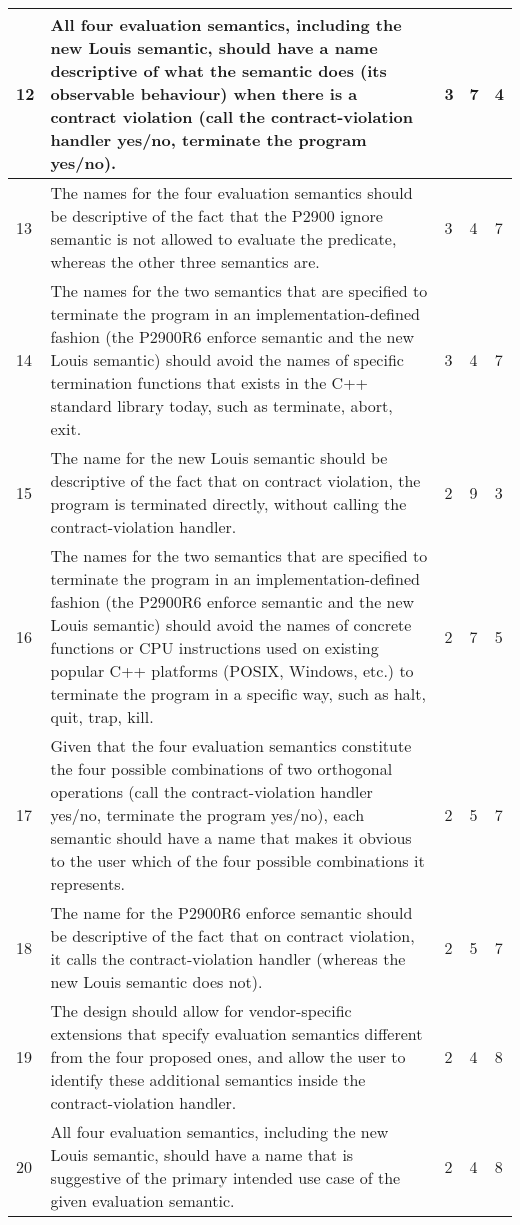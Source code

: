 \begin{longtable}{|p{0.8cm}|p{11.5cm}|p{0.6cm}|p{0.6cm}|p{0.6cm}|}
12 & All four evaluation semantics, including the new Louis semantic, should have a name descriptive of what the semantic does (its observable behaviour) when there is a contract violation (call the contract-violation handler yes/no, terminate the program yes/no). & 3 & 7 & 4 \\ \hline
13 & The names for the four evaluation semantics should be descriptive of the fact that the P2900 ignore semantic is not allowed to evaluate the predicate, whereas the other three semantics are. & 3 & 4 & 7 \\ \hline
14 & The names for the two semantics that are specified to terminate the program in an implementation-defined fashion (the P2900R6 enforce semantic and the new Louis semantic) should avoid the names of specific termination functions that exists in the C++ standard library today, such as terminate, abort, exit. & 3 & 4 & 7 \\ \hline
15 & The name for the new Louis semantic should be descriptive of the fact that on contract violation, the program is terminated directly, without calling the contract-violation handler. & 2 & 9 & 3 \\ \hline
16 & The names for the two semantics that are specified to terminate the program in an implementation-defined fashion (the P2900R6 enforce semantic and the new Louis semantic) should avoid the names of concrete functions or CPU instructions used on existing popular C++ platforms (POSIX, Windows, etc.) to terminate the program in a specific way, such as halt, quit, trap, kill. & 2 & 7 & 5 \\ \hline
17 & Given that the four evaluation semantics constitute the four possible combinations of two orthogonal operations (call the contract-violation handler yes/no, terminate the program yes/no), each semantic should have a name that makes it obvious to the user which of the four possible combinations it represents. & 2 & 5 & 7 \\ \hline
18 & The name for the P2900R6 enforce semantic should be descriptive of the fact that on contract violation, it calls the contract-violation handler (whereas the new Louis semantic does not). & 2 & 5 & 7 \\ \hline
19 & The design should allow for vendor-specific extensions that specify evaluation semantics different from the four proposed ones, and allow the user to identify these additional semantics inside the contract-violation handler. & 2 & 4 & 8 \\ \hline
20 & All four evaluation semantics, including the new Louis semantic, should have a name that is suggestive of the primary intended use case of the given evaluation semantic. & 2 & 4 & 8 \\ \hline

\end{longtable}
